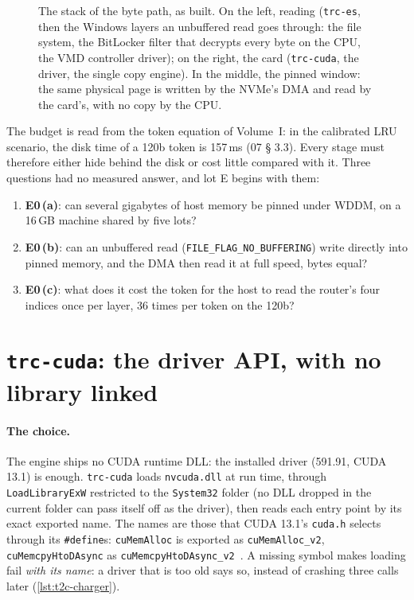 \begin{figure}[ht]
\centering
\resizebox{\linewidth}{!}{\SchemaChmPile}
\caption[The stack of the byte path]{The stack of the byte path, as built. On the left, reading (\texttt{trc-es}, then the Windows layers an unbuffered read goes through: the file system, the BitLocker filter that decrypts every byte on the CPU, the VMD controller driver); on the right, the card (\texttt{trc-cuda}, the driver, the single copy engine). In the middle, the pinned window: the same physical page is written by the NVMe's DMA and read by the card's, with no copy by the CPU.}
\label{fig:t2c-pile}
\end{figure}

The budget is read from the token equation of Volume~I: in the calibrated LRU scenario, the disk time of a 120b token is 157\,ms (07 § 3.3). Every stage must therefore either hide behind the disk or cost little compared with it. Three questions had no measured answer, and lot E begins with them:
\begin{enumerate}
\item \textbf{E0\,(a)}: can several gigabytes of host memory be pinned under WDDM, on a 16\,GB machine shared by five lots?
\item \textbf{E0\,(b)}: can an unbuffered read (\texttt{FILE\_FLAG\_NO\_BUFFERING}) write directly into pinned memory, and the DMA then read it at full speed, bytes equal?
\item \textbf{E0\,(c)}: what does it cost the token for the host to read the router's four indices once per layer, 36 times per token on the 120b?
\end{enumerate}

\section{\texttt{trc-cuda}: the driver API, with no library linked}\label{sec:t2c-cuda}

\paragraph{The choice.} The engine ships no CUDA runtime DLL: the installed driver (591.91, CUDA 13.1) is enough. \texttt{trc-cuda} loads \texttt{nvcuda.dll} at run time, through \texttt{LoadLibraryExW} restricted to the \texttt{System32} folder (no DLL dropped in the current folder can pass itself off as the driver), then reads each entry point by its exact exported name. The names are those that CUDA 13.1's \texttt{cuda.h} selects through its \texttt{\#define}s: \texttt{cuMemAlloc} is exported as \texttt{cuMemAlloc\_v2}, \texttt{cuMemcpyHtoDAsync} as \texttt{cuMemcpyHtoDAsync\_v2}~\cite{nvidia2026driverapi}. A missing symbol makes loading fail \emph{with its name}: a driver that is too old says so, instead of crashing three calls later (\cref{lst:t2c-charger}).

